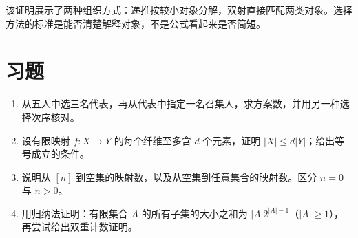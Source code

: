 该证明展示了两种组织方式：递推按较小对象分解，双射直接匹配两类对象。选择方法的标准是能否清楚解释对象，不是公式看起来是否简短。

\section{习题}
\begin{enumerate}
  \item\label{ex:objects-1} 从五人中选三名代表，再从代表中指定一名召集人，求方案数，并用另一种选择次序核对。
  \item\label{ex:objects-2} 设有限映射 $f:X\to Y$ 的每个纤维至多含 $d$ 个元素，证明 $|X|\le d|Y|$；给出等号成立的条件。
  \item\label{ex:objects-3} 说明从 $[n]$ 到空集的映射数，以及从空集到任意集合的映射数。区分 $n=0$ 与 $n>0$。
  \item\label{ex:objects-4} 用归纳法证明：有限集合 $A$ 的所有子集的大小之和为 $|A|2^{|A|-1}$（$|A|\ge1$），再尝试给出双重计数证明。
\end{enumerate}

